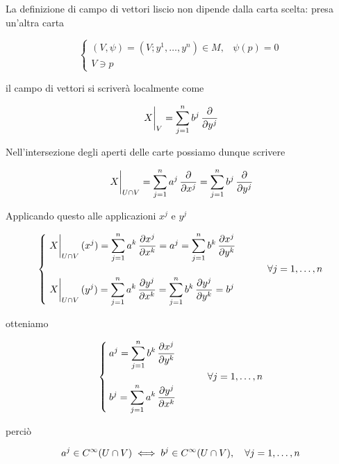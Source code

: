 La definizione di campo di vettori liscio non dipende dalla carta scelta: presa un'altra carta

\begin{equation}
	\begin{cases}
		(V,\psi) = (V; y^{1},\dots,y^{n}) \in M, & \psi(p) = 0 \\
		V \ni p
	\end{cases}
\end{equation}

il campo di vettori si scriverà localmente come

\begin{equation}
	\eval{X}_{V} = \sum_{j=1}^{n} b^{j} \, \pdv{y^{j}}
\end{equation}

Nell'intersezione degli aperti delle carte possiamo dunque scrivere

\begin{equation}
	\eval{X}_{U \cap V} = \sum_{j=1}^{n} a^{j} \, \pdv{x^{j}} = \sum_{j=1}^{n} b^{j} \, \pdv{y^{j}}
\end{equation}

Applicando questo alle applicazioni $ x^{j} $ e $ y^{j} $

\begin{equation}
	\begin{cases}
		\displaystyle \eval{X}_{U \cap V} (x^{j}) = \sum_{j=1}^{n} a^{k} \, \pdv{x^{j}}{x^{k}} = a^{j} = \sum_{j=1}^{n} b^{k} \, \pdv{x^{j}}{y^{k}} \\\\
		\displaystyle \eval{X}_{U \cap V} (y^{j}) = \sum_{j=1}^{n} a^{k} \, \pdv{y^{j}}{x^{k}} = \sum_{j=1}^{n} b^{k} \, \pdv{y^{j}}{y^{k}} = b^{j}
	\end{cases} %
	\qquad \forall j=1,\dots,n
\end{equation}

otteniamo

\begin{equation}
	\begin{cases}
		\displaystyle a^{j} = \sum_{j=1}^{n} b^{k} \, \pdv{x^{j}}{y^{k}} \\\\
		\displaystyle b^{j} = \sum_{j=1}^{n} a^{k} \, \pdv{y^{j}}{x^{k}}
	\end{cases} %
	\qquad \forall j=1,\dots,n
\end{equation}

perciò

\begin{equation}
	a^{j} \in C^{\infty}(U \cap V) \iff b^{j} \in C^{\infty}(U \cap V) \qcomma \forall j=1,\dots,n
\end{equation}

